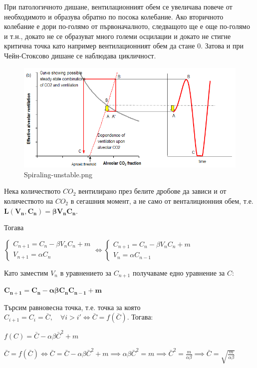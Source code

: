 \documentclass[11pt]{article}
\makeatletter
\def\maxwidth{\ifdim\Gin@nat@width>\linewidth\linewidth
    \else\Gin@nat@width\fi}
\let\Oldincludegraphics\includegraphics
\renewcommand{\includegraphics}[1]{\Oldincludegraphics[width=.8\maxwidth]{#1}}
\makeatother
\begin{document}
    При патологичното дишане, вентилационният обем се увеличава повече от
необходимото и образува обратно по посока колебание. Ако вторичното
колебание е дори по-голямо от първоначалното, следващото ще е още
по-голямо и т.н., докато не се образуват много големи осцилации и докато
не стигне критична точка като например вентилационният обем да стане 0.
Затова и при Чейн-Стоксово дишане се наблюдава цикличност.

\begin{figure}
\centering
\includegraphics{img/Spiraling-unstable.png}
\caption{Spiraling-unstable.png}
\end{figure}

    Нека количеството \(CO_2\) вентилирано през белите дробове да зависи и
от количеството на \(CO_2\) в сегашния момент, а не само от
венталиционния обем, т.е. \(\mathbf{L(V_n, C_n) = \beta V_n C_n}\).

Тогава

\(\begin{cases}  C_{n+1} = C_n - \beta V_n C_n + m\\  V_{n+1} = \alpha C_{n}  \end{cases}\Leftrightarrow  \begin{cases}  C_{n+1} = C_n - \beta V_n C_n + m\\  V_{n} = \alpha C_{n-1}  \end{cases}\)

Като заместим \(V_n\) в уравнението за \(C_{n+1}\) получаваме едно
уравнение за \(C\):

\(\mathbf{C_{n+1} = C_n - \alpha \beta C_n C_{n-1} + m}\)

    Търсим равновесна точка, т.е. точка за която
\(C_{i+1} = C_i = \bar{C}, \quad \forall i > i' \iff \bar{C} = f(\bar{C})\).
Тогава:

\(f(C) = \bar{C} - \alpha \beta \bar{C}^2 + m\)

\(\bar{C} = f(\bar{C}) \Leftrightarrow \bar{C} = \bar{C} - \alpha \beta \bar{C}^2 + m \implies \alpha \beta \bar{C}^2 = m \implies \bar{C}^2 = \frac{m}{\alpha \beta} \implies \bar{C} = \sqrt{\frac{m}{\alpha \beta}}\)
\end{document}
